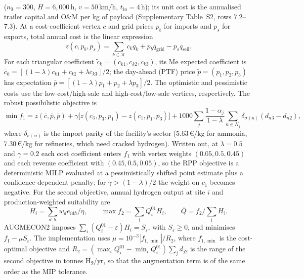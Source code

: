 ($n_0=300$, $H=6{,}000$\,h, $v=50$\,km/h, $t_{lu}=4$\,h); its unit cost is the annualised trailer
capital and O\&M per kg of payload (Supplementary Table~S2, rows 7.2--7.3). At a cost-coefficient vertex $c$ and grid prices $p_b$ for
imports and $p_s$ for exports, total annual cost is the linear expression
\begin{equation}
z(c,p_b,p_s)=\sum_{k\in\mathcal K}c_kq_k+p_bq_{\mathrm{grid}}-p_sq_{\mathrm{sell}}.
\label{eq:s5_cost}
\end{equation}
For each triangular coefficient $\tilde c_k=(c_{k1},c_{k2},c_{k3})$, its Me
expected coefficient is $\bar c_k=[(1-\lambda)c_{k1}+c_{k2}+\lambda c_{k3}]/2$;
the day-ahead (PTF) price $\tilde p=(p_1,p_2,p_3)$ has expectation
$\bar p=[(1-\lambda)p_1+p_2+\lambda p_3]/2$. The optimistic and pessimistic
costs use the low-cost/high-sale and high-cost/low-sale vertices, respectively.
The robust possibilistic objective is
\begin{equation}
\min f_1= z(\bar c,\bar p,\bar p)
+\gamma\big[z(c_3,p_3,p_1)-z(c_1,p_1,p_3)\big]
+1000\sum_j\frac{1-\alpha_j}{1-\lambda}\sum_{n\in N_j}\delta_{\sigma(n)}(d_{n3}-d_{n2}),
\label{eq:s5_rpp_objective}
\end{equation}
where $\delta_{\sigma(n)}$ is the import parity of the facility's sector (5.63\,€/kg for ammonia,
7.30\,€/kg for refineries, which need cracked hydrogen).
Written out, at $\lambda=0.5$ and $\gamma=0.2$ each cost coefficient enters $f_1$ with vertex weights
$(0.05,0.5,0.45)$ and each revenue coefficient with $(0.45,0.5,0.05)$, so the RPP objective is a
deterministic MILP evaluated at a pessimistically shifted point estimate plus a confidence-dependent
penalty; for $\gamma>(1-\lambda)/2$ the weight on $c_1$ becomes negative. For the second objective, annual
hydrogen output at site $i$ and production-weighted suitability are
\begin{equation}
H_i=\sum_{d,h}w_de_{idh}/\eta,\qquad
\max f_2=\sum_iQ_i^{01}H_i,\qquad
\bar Q=f_2/\sum_iH_i.
\label{eq:s5_suitability}
\end{equation}
AUGMECON2 imposes $\sum_i(Q_i^{01}-\varepsilon)H_i=S_\varepsilon$, with
$S_\varepsilon\ge0$, and minimises $f_1-\mu S_\varepsilon$. The implementation
uses $\mu=10^{-3}|f_{1,\min}|/R_2$, where $f_{1,\min}$ is the cost-optimal
objective and $R_2=(\max_iQ_i^{01}-\min_iQ_i^{01})\sum_jd_{j2}$ is the range of the second objective in
tonnes H\textsubscript{2}/yr, so that the augmentation term is of the same order as the MIP tolerance.
